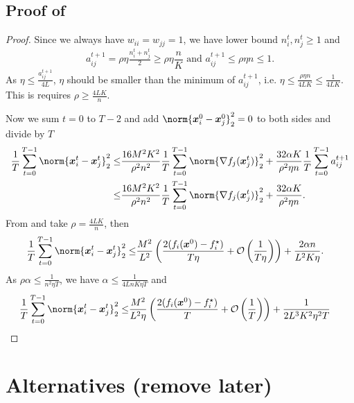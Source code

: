 \documentclass{article}
\begin{document}
\subsection{Proof of }\label{ssec:proof:consensus-distance:balanced}
\begin{proof}
  Since we always have $w_{ii}=w_{jj}=1$, we have lower bound $n_i^t,n_j^t\ge1$ and
  \begin{equation}
    a_{ij}^{t+1} = \rho\eta \tfrac{n_i^t+n_j^t}{2} \ge \rho\eta \frac{n}{K} \text{ and }
    a_{ij}^{t+1} \le \rho\eta n \le 1.
  \end{equation}
  As $\eta\le\frac{a_{ij}^{t+1}}{4L}$, $\eta$ should be smaller than the minimum of $a_{ij}^{t+1}$, i.e. $\eta\le\frac{\rho\eta n}{4LK}\le\frac{1}{4LK}$. This is requires $\rho\ge\frac{4LK}{n}$.

  Now we sum $t=0$ to $T-2$ and add $\norm{\xx_i^0-\xx_j^0}_2^2=0$ to both sides and divide by $T$
  \begin{align*}
    \frac{1}{T} \sum_{t=0}^{T-1} \norm{\xx_i^{t} - \xx_j^{t}}_2^2
    \le& \frac{16M^2K^2}{\rho^2n^2} \frac{1}{T} \sum_{t=0}^{T-1} \norm{\nabla f_j(\xx_j^t)}_2^2 
    +\frac{32\alpha K}{\rho^2\eta n} \frac{1}{T} \sum_{t=0}^{T-1}a_{ij}^{t+1} \\
    \le& \frac{16M^2K^2}{\rho^2n^2} \frac{1}{T} \sum_{t=0}^{T-1} \norm{\nabla f_j(\xx_j^t)}_2^2 
    +\frac{32\alpha K}{\rho^2\eta n}.
  \end{align*}
  From  and take $\rho=\frac{4LK}{n}$, then
  \begin{align*}
    \frac{1}{T} \sum_{t=0}^{T-1} \norm{\xx_i^{t} - \xx_j^{t}}_2^2
    \le& \frac{M^2}{L^2} \left(\frac{2(f_i(\xx^{0}) - f_i^\star)}{T\eta} + \cO\left(\frac{1}{T\eta}\right) \right)
    +\frac{2\alpha n}{L^2K\eta}.
  \end{align*}
  As $\rho\alpha\le\frac{1}{n^2 \eta T}$, we have $\alpha\le\frac{1}{4LnK\eta T}$ and
  \begin{align*}
    \frac{1}{T} \sum_{t=0}^{T-1} \norm{\xx_i^{t} - \xx_j^{t}}_2^2
    \le& \frac{M^2}{L^2\eta}\left( \frac{2(f_i(\xx^{0}) - f_i^\star)}{T} + \cO\left(\frac{1}{T}\right) \right)
    + \frac{1}{2L^3K^2\eta^2T}
  \end{align*}
\end{proof}


\section{Alternatives  (remove later)}
\end{document}
